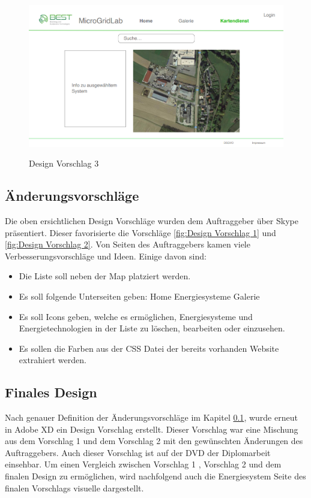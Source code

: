 \begin{figure}[h]
	\centering
	\includegraphics[height=7cm,width=12cm]{images/DesignVorschlag3}
	\caption{Design Vorschlag 3}
	\label{fig:Design Vorschlag 3}
\end{figure}
\subsection{Änderungsvorschläge} \label{sec:Änderungsvorschläge}
Die oben ersichtlichen Design Vorschläge wurden dem Auftraggeber über Skype präsentiert. Dieser favorisierte die Vorschläge \ref{fig:Design Vorschlag 1} und  \ref{fig:Design Vorschlag 2}. 
Von Seiten des Auftraggebers kamen viele Verbesserungsvorschläge und Ideen. Einige davon sind:
\begin{itemize}
	\item Die Liste soll neben der Map platziert werden.
	\item Es soll folgende Unterseiten geben:
	\subitem Home
	\subitem Energiesysteme
	\subitem Galerie
	\item Es soll Icons geben, welche es ermöglichen, Energiesysteme und Energietechnologien in der Liste zu löschen, bearbeiten oder einzusehen. 
	\item Es sollen die Farben aus der CSS Datei der bereits vorhanden Website extrahiert werden.
	
\end{itemize}


\subsection{Finales Design}
Nach genauer Definition der Änderungsvorschläge im Kapitel \ref{sec:Änderungsvorschläge}, wurde erneut in Adobe XD ein Design Vorschlag erstellt. Dieser Vorschlag war eine Mischung aus dem Vorschlag 1 und dem Vorschlag 2 mit den gewünschten Änderungen des Auftraggebers. Auch dieser Vorschlag ist auf der DVD der Diplomarbeit einsehbar. Um einen Vergleich zwischen Vorschlag 1 , Vorschlag 2 und dem finalen Design zu ermöglichen, wird nachfolgend auch die Energiesystem Seite des finalen Vorschlags visuelle dargestellt.

